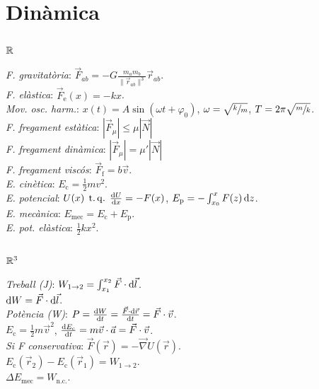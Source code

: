 \section{Din\`amica}

\subsection{$\mathbb{R}$}
\emph{F. gravitat\`oria}: $\vec{F}_{ab} = -G \frac{m_a m_b}{\|\vec{r}_{ab}\|^3} \vec{r}_{ab}$. \\
\emph{F. el\`astica}: $\vec{F}_{\text{e}}(x) = -kx$. \\
\emph{Mov. osc. harm.}: $x(t) = A\sin (\omega t + \varphi_0)$, $\omega = \sqrt{\sfrac{k}{m}}$, $T = 2\pi\sqrt{\sfrac{m}{k}}$. \\
\emph{F. fregament estàtica}: $|\vec{F}_\mu| \leq \mu |\vec{N}|$\\
\emph{F. fregament dinàmica}: $|\vec{F}_\mu| = \mu' |\vec{N}|$\\
\emph{F. fregament visc\'os}: $\vec{F}_{\text{f}} = b\vec{v}$. \\
\emph{E. cin\`etica}: $E_{\text{c}} = \frac{1}{2}mv^2$. \\
\emph{E. potencial}: $U(x) \tq \frac{\dif U}{\dif x} = -F(x)$, $E_{\text{p}} = -\int_{x_0}^x F(z) \dif z$. \\
\emph{E. mecànica}: $E_{\text{mec}} = E_{\text{c}} + E_{\text{p}}$. \\
\emph{E. pot. el\`astica}: $\frac{1}{2}kx^2$.

\subsection{$\mathbb{R}^3$}
\emph{Treball (J)}: $W_{1\rightarrow 2} = \int_{x_1}^{x_2} \vec{F} \cdot\dif \vec{l}$. \\
\ci $\dif W = \vec{F} \cdot\dif \vec{l}$. \\
\emph{Pot\`encia (W)}: $P = \frac{\dif W}{\dif t} = \frac{\vec{F} \cdot\dif \vec{r}}{\dif t} = \vec{F}\cdot\vec{v}$. \\
\ci $E_{\text{c}} = \frac{1}{2}m\vec{v}^2$, $\frac{\dif E_{\text{c}}}{\dif t} = m\vec{v}\cdot\vec{a} = \vec{F}\cdot\vec{v}$. \\
\emph{Si F conservativa}: $\vec{F}(\vec{r}) = -\vec{\nabla}U(\vec{r})$. \\
\ci $E_{\text{c}}(\vec{r}_2) - E_{\text{c}}(\vec{r}_1) = W_{1\rightarrow 2}$. \\
\ci $\Delta E_{\text{mec}} = W_{\text{n.c.}}$.


